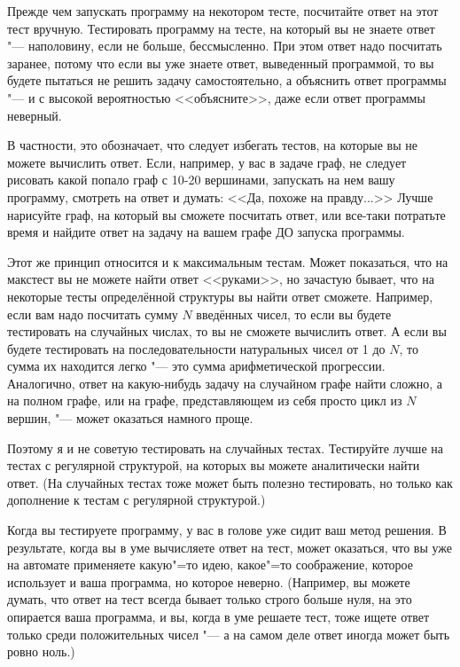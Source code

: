  Прежде чем запускать программу на некотором тесте, посчитайте ответ на этот тест вручную. 
Тестировать программу на тесте, на который вы не знаете ответ "--- наполовину, если не больше, бессмысленно.
При этом ответ надо посчитать заранее, потому что если вы уже знаете ответ, выведенный программой, 
то вы будете пытаться не решить задачу самостоятельно, а объяснить ответ программы "--- и с высокой вероятностью <<объясните>>, 
даже если ответ программы неверный.

В частности, это обозначает, что следует избегать тестов, на которые вы не можете вычислить ответ. 
Если, например, у вас в задаче граф, не следует рисовать какой попало граф с 10-20 вершинами, запускать на нем вашу программу, смотреть на ответ и думать:
<<Да, похоже на правду...>> Лучше нарисуйте граф, на который вы сможете посчитать ответ, или все-таки потратьте время и найдите ответ на задачу 
на вашем графе ДО запуска программы.

Этот же принцип относится и к максимальным тестам. Может показаться, что на макстест вы не можете найти ответ <<руками>>, но зачастую бывает,
что на некоторые тесты определённой структуры вы найти ответ сможете. 
Например, если вам надо посчитать сумму $N$ введённых чисел, то если вы будете тестировать на случайных числах, то вы не сможете вычислить ответ. 
А если вы будете тестировать на последовательности натуральных чисел от 1 до $N$, то сумма их находится легко "--- это сумма арифметической прогрессии.
Аналогично, ответ на какую-нибудь задачу на случайном графе найти сложно, а на полном графе, или на графе, представляющем из себя просто цикл из $N$ вершин,
"--- может оказаться намного проще.

Поэтому я и не советую тестировать на случайных тестах. 
Тестируйте лучше на тестах с регулярной структурой, на которых вы можете аналитически найти ответ.
(На случайных тестах тоже может быть полезно тестировать, но только как дополнение к тестам с регулярной структурой.)

Когда вы тестируете программу, у вас в голове уже сидит ваш метод решения. В результате, когда вы в уме вычисляете ответ на тест,
может оказаться, что вы уже на автомате применяете какую"=то идею, какое"=то соображение, которое использует и ваша программа,
но которое неверно. 
(Например, вы можете думать, что ответ на тест всегда бывает только строго больше нуля, на это опирается ваша программа, 
и вы, когда в уме решаете тест, тоже ищете ответ только среди положительных чисел "--- а на самом деле ответ иногда может быть ровно ноль.)

